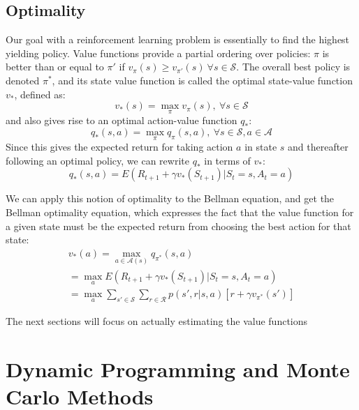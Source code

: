 \documentclass[12pt, reqno]{article}
\theoremstyle{plain}    \newtheorem{theorem}{Theorem}[section]
\theoremstyle{plain}    \newtheorem{lemma}[theorem]{Lemma}
\theoremstyle{plain}    \newtheorem{claim}[theorem]{Claim}
\theoremstyle{plain}    \newtheorem{definition}{Definition}[section]
\theoremstyle{plain}    \newtheorem{proposition}[theorem]{Proposition}
\theoremstyle{plain}    \newtheorem{corollary}[theorem]{Corollary}
\theoremstyle{plain}    \newtheorem{example}[definition]{Example}
\numberwithin{equation}{section}
\begin{document}
\subsection{Optimality}

Our goal with a reinforcement learning problem is essentially to find the
highest yielding policy. Value functions provide a partial ordering over
policies: \(\pi\) is better than or equal to \(\pi'\) if \(v_{\pi}(s) \ge
v_{\pi'}(s) \ \forall s \in \mathcal{S}\). The overall best policy is denoted
\(\pi^*\), and its state value function is called the optimal state-value
function \(v_*\), defined as:
\[v_*(s) = \max_{\pi}v_{\pi}(s), \ \forall s \in \mathcal{S} \]
and also gives rise to an optimal action-value function \(q_*\):
\[q_*(s,a) = \max_{\pi}q_{\pi}(s,a), \ \forall s \in \mathcal{S}, a \in \mathcal{A}\]
Since this gives the 
expected return for taking action \(a\) in state \(s\) and thereafter following
an optimal policy, we can rewrite \(q_*\) in terms of \(v_*\):
\[q_{*}(s,a) = E(R_{t+1} + \gamma v_{*}(S_{t+1})|S_t = s, A_t = a)\]

We can apply this notion of optimality to the Bellman equation, and get the
Bellman optimality equation, which expresses the fact that the value function
for a given state must be the expected return from choosing the best action for
that state:
\begin{gather*}
	v_*(a) = \max_{a \in \mathcal{A}(s)}q_{\pi^*}(s,a) \\
	= \max_a E(R_{t+1} + \gamma v_{*}(S_{t+1})|S_t = s, A_t = a) \\
	= \max_a \sum_{s' \in \mathcal{S}}\sum_{r \in \mathcal{R}}p(s', r | s,a)[r + \gamma v_{\pi^*}(s')]
\end{gather*}

The next sections will focus on actually estimating the value functions 
\section{Dynamic Programming and Monte Carlo Methods}
\end{document}
